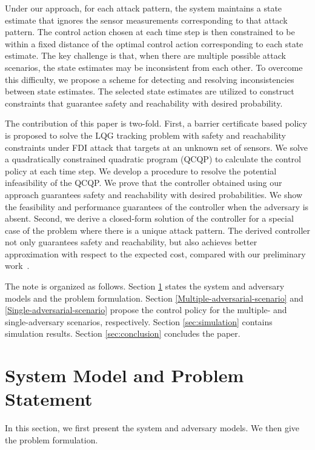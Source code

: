 \documentclass[journal]{IEEEtran}
\begin{document}
Under our approach, for each attack pattern, the system maintains a state estimate that ignores the sensor measurements corresponding to that attack pattern. The control action chosen at each time step is then constrained to be within a fixed distance of the optimal control action corresponding to each state estimate. The key challenge is that, when there are multiple possible attack scenarios, the state estimates may be inconsistent from each other. To overcome this difficulty, we propose a scheme for detecting and resolving inconsistencies between state estimates. The selected state estimates are utilized to construct constraints that guarantee safety and reachability with desired probability.

The contribution of this paper is two-fold. First, a barrier certificate based policy is proposed to solve the LQG tracking problem with safety and reachability constraints under FDI attack that targets at an unknown set of sensors. We solve a quadratically constrained quadratic program (QCQP) to calculate the control policy at each time step. We develop a procedure to resolve the potential infeasibility of the QCQP. We prove that the controller obtained using our approach guarantees safety and reachability with desired probabilities. We show the feasibility and performance guarantees of the controller when the adversary is absent. Second, we derive a closed-form solution of the controller for a special case of the problem where there is a unique attack pattern. The derived controller not only guarantees safety and reachability, but also achieves better approximation with respect to the expected cost, compared with our preliminary work~\cite{niu2019lqg}.

The note is organized as follows. Section \ref{sec:system_model} states the system and adversary models and the problem formulation. Section \ref{Multiple-adversarial-scenario} and \ref{Single-adversarial-scenario} propose the control policy for the multiple- and single-adversary scenarios, respectively. Section \ref{sec:simulation} contains simulation results. Section \ref{sec:conclusion} concludes the paper.



\section{System Model and Problem Statement}
\label{sec:system_model}
In this section, we first present the system and adversary models. We then give the problem formulation. 
\end{document}
